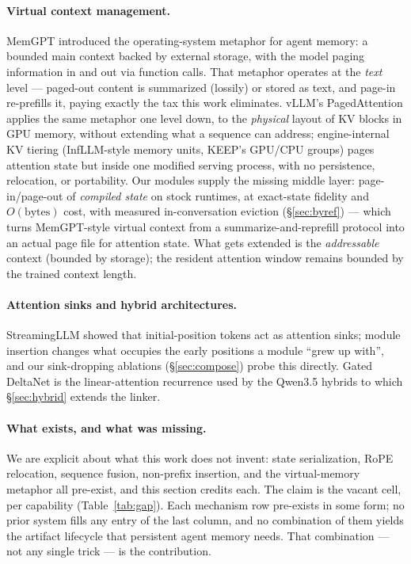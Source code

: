 \documentclass[11pt]{article}
\begin{document}
\paragraph{Virtual context management.}
MemGPT \citep{packer2023} introduced the operating-system metaphor for agent memory: a bounded main context backed by external storage, with the model paging information in and out via function calls. That metaphor operates at the \emph{text} level --- paged-out content is summarized (lossily) or stored as text, and page-in re-prefills it, paying exactly the tax this work eliminates. vLLM's PagedAttention \citep{kwon2023} applies the same metaphor one level down, to the \emph{physical} layout of KV blocks in GPU memory, without extending what a sequence can address; engine-internal KV tiering (InfLLM-style memory units, KEEP's GPU/CPU groups) pages attention state but inside one modified serving process, with no persistence, relocation, or portability. Our modules supply the missing middle layer: page-in/page-out of \emph{compiled state} on stock runtimes, at exact-state fidelity and $O(\text{bytes})$ cost, with measured in-conversation eviction (\S\ref{sec:byref}) --- which turns MemGPT-style virtual context from a summarize-and-reprefill protocol into an actual page file for attention state. What gets extended is the \emph{addressable} context (bounded by storage); the resident attention window remains bounded by the trained context length.

\paragraph{Attention sinks and hybrid architectures.}
StreamingLLM \citep{xiao2024} showed that initial-position tokens act as attention sinks; module insertion changes what occupies the early positions a module ``grew up with'', and our sink-dropping ablations (\S\ref{sec:compose}) probe this directly. Gated DeltaNet \citep{yangs2025} is the linear-attention recurrence used by the Qwen3.5 hybrids to which \S\ref{sec:hybrid} extends the linker.

\paragraph{What exists, and what was missing.}
We are explicit about what this work does not invent: state serialization, RoPE relocation, sequence fusion, non-prefix insertion, and the virtual-memory metaphor all pre-exist, and this section credits each. The claim is the vacant cell, per capability (Table~\ref{tab:gap}). Each mechanism row pre-exists in some form; no prior system fills any entry of the last column, and no combination of them yields the artifact lifecycle that persistent agent memory needs. That combination --- not any single trick --- is the contribution.
\end{document}
